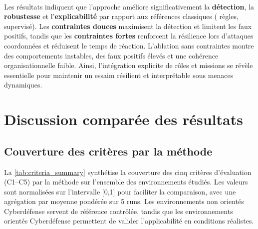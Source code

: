 \

Les résultats indiquent que l'approche  améliore significativement la \textbf{détection}, la \textbf{robustesse} et l'\textbf{explicabilité} par rapport aux références classiques ( règles,  supervisé).
Les \textbf{contraintes douces} maximisent la détection et limitent les faux positifs, tandis que les \textbf{contraintes fortes} renforcent la résilience lors d'attaques coordonnées et réduisent le temps de réaction.
L'ablation sans contraintes montre des comportements instables, des faux positifs élevés et une cohérence organisationnelle faible.
Ainsi, l'intégration explicite de rôles et missions se révèle essentielle pour maintenir un essaim résilient et interprétable sous menaces dynamiques.


\section{Discussion comparée des résultats}

\subsection{Couverture des critères par la méthode}

La \autoref{tab:criteria_summary} synthétise la couverture des cinq critères d'évaluation (C1--C5) par la méthode  sur l'ensemble des environnements étudiés.
Les valeurs sont normalisées sur l'intervalle [0,1] pour faciliter la comparaison, avec une agrégation par moyenne pondérée sur 5 runs.
Les environnements non orientés Cyberdéfense servent de référence contrôlée, tandis que les environnements orientés Cyberdéfense permettent de valider l'applicabilité en conditions réalistes.

